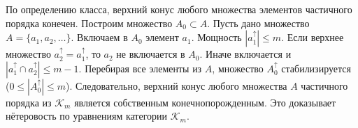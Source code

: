 \documentclass[12pt]{article}
\theoremstyle{break}
\def\K{\mathcal{K}_m}
\begin{document}
		По определению класса, верхний конус любого множества элементов частичного порядка конечен. Построим множество $A_0\subset A$. Пусть дано множество $A = \{a_1, a_2,\dots\}.$ Включаем в $A_0$ элемент $a_1$. Мощность $|a_1^{\uparrow}| \leqslant m.$ Если верхнее множество $a_2^{\uparrow} = a_1^{\uparrow}$, то $a_2$ не включается в $A_0$. Иначе включается и $|a_1^{\uparrow} \cap a_2^{\uparrow}| \leqslant m-1$. Перебирая все элементы из $A$, множество $A_0^{\uparrow}$ стабилизируется ($0 \leqslant |A_0^{\uparrow}| \leqslant m$). Следовательно, верхний конус любого множества $A$ частичного порядка из $\K$ является собственным конечнопорожденным. Это доказывает нётеровость по уравнениям категории $\K$.
	
\end{document}
